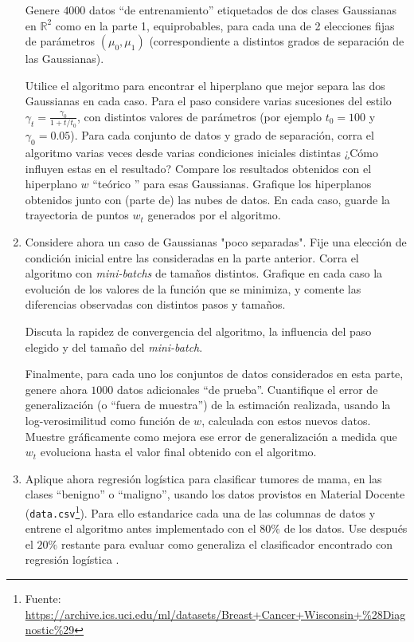 \begin{enumerate}
    Genere $4000$ datos  ``de entrenamiento'' etiquetados de dos clases Gaussianas  en $\mathbb{R}^2$ como en la parte 1,  equiprobables, para  cada una de 2 elecciones  fijas de par\'ametros $(\mu_0,\mu_1)$ (correspondiente a distintos grados de separaci\'on de las Gaussianas).  
    
    Utilice el algoritmo para encontrar  el hiperplano  que mejor separa las dos Gaussianas en cada caso. Para el paso considere varias sucesiones del estilo  $\gamma_t = \frac{\gamma_0}{1+t/t_0}$, con  distintos valores de par\'ametros (por ejemplo $t_0 = 100$ y $\gamma_0 = 0.05$).  
    Para cada conjunto de datos y grado de separaci\'on, corra el algoritmo varias veces desde  varias  condiciones iniciales  distintas ¿C\'omo influyen estas en el resultado? Compare los resultados obtenidos con el  hiperplano $w$ ``te\'orico '' para esas Gaussianas. Grafique los hiperplanos obtenidos junto con (parte de) las nubes de datos.  En cada caso, guarde la trayectoria de puntos  $w_t$ generados por el algoritmo.  
  
  \item Considere ahora un caso de  Gaussianas  "poco separadas".  Fije una elecci\'on de condici\'on inicial entre las consideradas  en la parte anterior.  Corra el algoritmo con  \emph{mini-batchs} de  tama\~nos  distintos. Grafique en cada caso la evoluci\'on de los valores de la funci\'on que se minimiza, y comente las diferencias  observadas con distintos pasos y tamaños. 

    Discuta la rapidez de convergencia del algoritmo, la influencia del paso elegido y del tama\~no del \emph{mini-batch}.  
   
   Finalmente, para  cada uno los conjuntos de datos considerados en esta parte,  genere ahora $1000$ datos adicionales ``de  prueba''.  Cuantifique el error de generalizaci\'on (o ``fuera de muestra'') de la estimaci\'on realizada, usando la log-verosimilitud como funci\'on de $w$, calculada con estos nuevos datos.  Muestre gr\'aficamente como mejora ese error de generalizaci\'on  a medida que $w_t$ evoluciona hasta el valor final obtenido con el algoritmo.  
   
 \item Aplique ahora regresi\'on logística para clasificar  tumores de mama, en las clases ``benigno'' o ``maligno'',  usando los datos provistos en Material Docente (\texttt{data.csv}\footnote{Fuente: \url{https://archive.ics.uci.edu/ml/datasets/Breast+Cancer+Wisconsin+\%28Diagnostic\%29}}). Para ello estandarice cada una de las columnas de datos y entrene el algoritmo antes implementado con el $80\%$ de los datos.  Use despu\'es el $20\%$ restante para  evaluar como generaliza el clasificador encontrado con regresi\'on log\'istica . 
\end{enumerate}
\fi